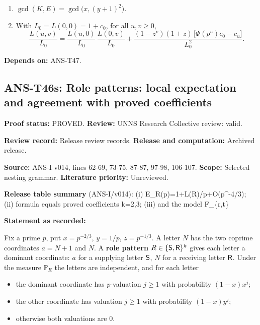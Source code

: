 \documentclass[
  11pt,
]{article}
\providecommand{\tightlist}{%
  \setlength{\itemsep}{0pt}\setlength{\parskip}{0pt}}
\begin{document}
\begin{enumerate}
\def\labelenumi{(\roman{enumi})}
\item
  \(\gcd(K,E)=\gcd\big(x,(y+1)^2\big)\).
\item
  With \(L_0=L(0,0)=1+c_0\), for all \(u,v\ge0\),
  \[\frac{L(u,v)}{L_0}=\frac{L(u,0)}{L_0}\,\frac{L(0,v)}{L_0}+\frac{(1-z^v)(1+z)\,\big[\Phi(p^u)c_0-c_u\big]}{L_0^2}.\]
\end{enumerate}

\textbf{Depends on:} ANS-T47.

\hypertarget{ans-t46s-role-patterns-local-expectation-and-agreement-with-proved-coefficients}{%
\subsection{ANS-T46s: Role patterns: local expectation and agreement
with proved
coefficients}\label{ans-t46s-role-patterns-local-expectation-and-agreement-with-proved-coefficients}}

\textbf{Proof status:} PROVED. \textbf{Review:} UNNS Research Collective
review: valid.

\textbf{Review record:} Release review records. \textbf{Release and
computation:} Archived release.

\textbf{Source:} ANS-I v014, lines 62-69, 73-75, 87-87, 97-98, 106-107.
\textbf{Scope:} Selected nesting grammar. \textbf{Literature priority:}
Unreviewed.

\textbf{Release table summary} (ANS-I/v014): (i)
E\_R(p)=1+L(R)/p+O(p\^{}-4/3); (ii) formula equals proved coefficients
k=2,3; (iii) and the model F\_\{r,t\}

\textbf{Statement as recorded:}

Fix a prime \(p\), put \(x=p^{-2/3}\), \(y=1/p\), \(z=p^{-1/3}\). A
letter \(N\) has the two coprime coordinates \(a=N+1\) and \(N\). A
\textbf{role pattern} \(R\in\{{\sf S},{\sf R}\}^k\) gives each letter a
dominant coordinate: \(a\) for a supplying letter \({\sf S}\), \(N\) for
a receiving letter \({\sf R}\). Under the measure \(\mathbb P_R\) the
letters are independent, and for each letter

\begin{itemize}
\tightlist
\item
  the dominant coordinate has \(p\)-valuation \(j\ge1\) with probability
  \((1-x)x^j\);
\item
  the other coordinate has valuation \(j\ge1\) with probability
  \((1-x)y^j\);
\item
  otherwise both valuations are \(0\).
\end{itemize}
\end{document}
